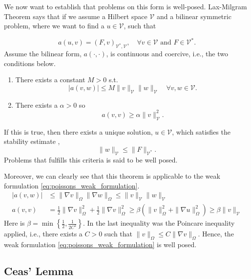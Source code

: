 We now want to establish that problems on this form is well-posed.
Lax-Milgram Theorem says that if we assume a Hilbert space $\mathcal{V} $ and a bilinear symmetric problem, where we want to find a $u \in \mathcal{V} $,  such that

\begin{equation*}
    a\left( u,v \right)  = \left( F, v \right) _{\mathcal{V} ^{*}, \mathcal{V} }, \quad \forall v \in  \mathcal{V} \text{ and } F \in \mathcal{V} ^{*}
.\end{equation*}
 Assume the bilinear form, $a\left( \cdot ,\cdot  \right) $, is continuous and coercive, i.e., the two conditions below.
\begin{enumerate}[label=\arabic*)]
    \item There exists a constant $M>0$ s.t. \[
    \left\lvert a\left( v,w \right)  \right\rvert \le M \| v \|_{ \mathcal{V}  }^{  } \| w \|_{ \mathcal{V}  }^{  }  \quad \forall v,w \in \mathcal{V}.
    \]
\item There exists a $\alpha  > 0$  so \[
a\left( v,v \right)  \ge  \alpha \| v \|_{ \mathcal{V}  }^{ 2 }.
\]
\end{enumerate}
If this is true, then there exists a unique solution, $u \in \mathcal{V} $, which satisfies the stability estimate \cite{manzoni2021optimal}, \[
\| w \|_{ \mathcal{V}   }^{  } \le  \| F \|_{ \mathcal{V} ^{*} }^{  }.
\]
Problems that fulfills this criteria is said to be well posed.

Moreover, we can clearly see that this theorem is applicable to the weak formulation \eqref{eq:poissons_weak_formulation}.
\[
\begin{split}
    \left\lvert a\left( v,w \right)  \right\rvert & \le \| \nabla v \|_{ \Omega  }^{  } \| \nabla w \|_{ \Omega  }^{  } \le \| v \|_{ \mathcal{V}  }^{  } \| w \|_{\mathcal{V}   }^{  }   \\
 a\left( v,v \right)    & = \frac{1}{2} \| \nabla v  \|_{ \Omega  }^{  2} + \frac{1}{2} \| \nabla v  \|_{ \Omega  }^{  2} \ge \beta \left( \| v \|_{\Omega   }^{ 2 }  + \| \nabla u \|_{\Omega   }^{ 2 } \right) \ge \beta \| v \|_{\mathcal{V}   }^{  }
\end{split}
\]
 Here is $\beta = \min_{} \left\{ \frac{1}{2}, \frac{1}{2C^{2}} \right\} $. In the last inequality was the Poincare inequality applied, i.e., there exists a $C>0$  such that $\| v \|_{ \Omega  }^{  } \le C  \| \nabla v \|_{\Omega   }^{  } $. Hence, the weak formulation \eqref{eq:poissons_weak_formulation} is well posed.

\subsection{Ceas' Lemma}%
\label{sub:ceas_lemma}

